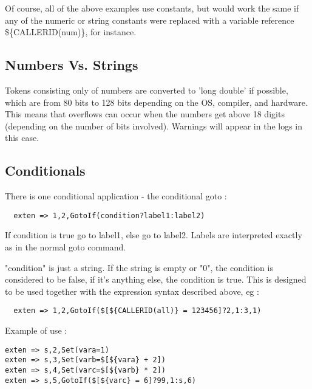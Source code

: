 Of course, all of the above examples use constants, but would work the
same if any of the numeric or string constants were replaced with a
variable reference \$\{CALLERID(num)\}, for instance.


\subsection{Numbers Vs. Strings}

Tokens consisting only of numbers are converted to 'long double' if possible, which
are from 80 bits to 128 bits depending on the OS, compiler, and hardware.
This means that overflows can occur when the
numbers get above 18 digits (depending on the number of bits involved).  Warnings will appear in the logs in this
case.

\subsection{Conditionals}

There is one conditional application - the conditional goto :
\begin{astlisting}
\begin{verbatim}
  exten => 1,2,GotoIf(condition?label1:label2)
\end{verbatim}
\end{astlisting}

If condition is true go to label1, else go to label2. Labels are interpreted
exactly as in the normal goto command.

"condition" is just a string. If the string is empty or "0", the condition
is considered to be false, if it's anything else, the condition is true.
This is designed to be used together with the expression syntax described
above, eg :

\begin{astlisting}
\begin{verbatim}
  exten => 1,2,GotoIf($[${CALLERID(all)} = 123456]?2,1:3,1)
\end{verbatim}
\end{astlisting}

Example of use :
\begin{astlisting}
\begin{verbatim}
exten => s,2,Set(vara=1)
exten => s,3,Set(varb=$[${vara} + 2])
exten => s,4,Set(varc=$[${varb} * 2])
exten => s,5,GotoIf($[${varc} = 6]?99,1:s,6)
\end{verbatim}
\end{astlisting}

